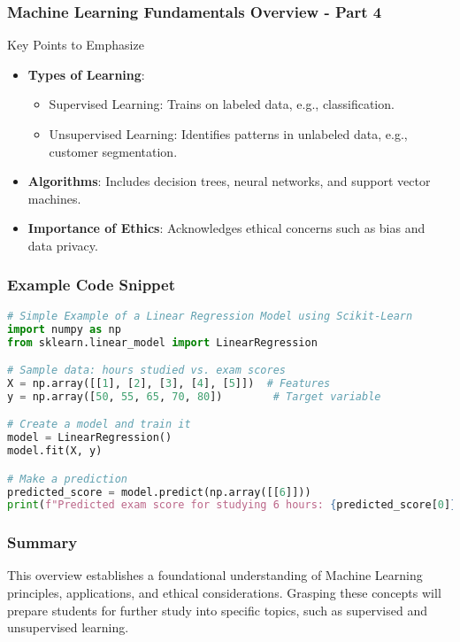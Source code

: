 \documentclass[aspectratio=169]{beamer}
\begin{document}
\begin{frame}[fragile]
    \frametitle{Machine Learning Fundamentals Overview - Part 4}
    \begin{block}{Key Points to Emphasize}
        \begin{itemize}
            \item \textbf{Types of Learning}:
            \begin{itemize}
                \item Supervised Learning: Trains on labeled data, e.g., classification.
                \item Unsupervised Learning: Identifies patterns in unlabeled data, e.g., customer segmentation.
            \end{itemize}
            \item \textbf{Algorithms}: Includes decision trees, neural networks, and support vector machines.
            \item \textbf{Importance of Ethics}: Acknowledges ethical concerns such as bias and data privacy.
        \end{itemize}
    \end{block}
\end{frame}

\begin{frame}[fragile]
    \frametitle{Example Code Snippet}
    \begin{lstlisting}[language=Python]
# Simple Example of a Linear Regression Model using Scikit-Learn
import numpy as np
from sklearn.linear_model import LinearRegression

# Sample data: hours studied vs. exam scores
X = np.array([[1], [2], [3], [4], [5]])  # Features
y = np.array([50, 55, 65, 70, 80])        # Target variable

# Create a model and train it
model = LinearRegression()
model.fit(X, y)

# Make a prediction
predicted_score = model.predict(np.array([[6]]))
print(f"Predicted exam score for studying 6 hours: {predicted_score[0]}")
    \end{lstlisting}
\end{frame}

\begin{frame}[fragile]
    \frametitle{Summary}
    This overview establishes a foundational understanding of Machine Learning principles, applications, and ethical considerations. 
    Grasping these concepts will prepare students for further study into specific topics, such as supervised and unsupervised learning.
\end{frame}
\end{document}
